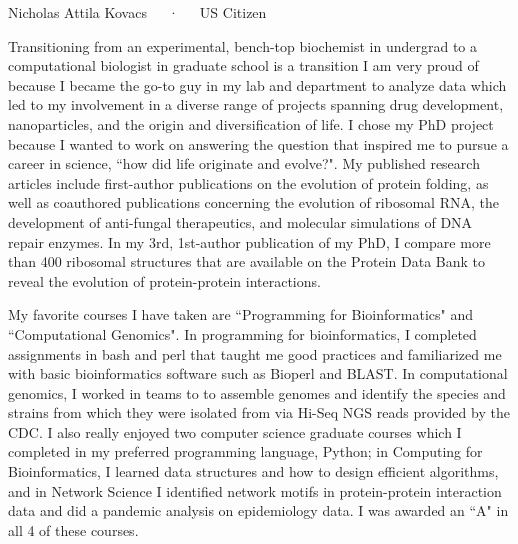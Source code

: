 \documentclass[11pt, letterpaper]{CV_latex_class}
\begin{document}
\makecvheader

\makecvfooter
  {Nicholas Attila Kovacs~~~·~~~US Citizen}

\makelettertitle

\begin{cvletter}


\hspace{1em} Transitioning from an experimental, bench-top biochemist in undergrad to a computational biologist in graduate school is a transition I am very proud of because I became the go-to guy in my lab and department to analyze data which led to my involvement in a diverse range of projects spanning drug development, nanoparticles, and the origin and diversification of life. I chose my PhD project because I wanted to work on answering the question that inspired me to pursue a career in science, ``how did life originate and evolve?". My published research articles include first-author publications on the evolution of protein folding, as well as coauthored publications concerning the evolution of ribosomal RNA, the development of anti-fungal therapeutics, and molecular simulations of DNA repair enzymes. In my 3rd, 1st-author publication of my PhD, I compare more than 400 ribosomal structures that are available on the Protein Data Bank to reveal the evolution of protein-protein interactions.

\hspace{1em}My favorite courses I have taken are ``Programming for Bioinformatics" and ``Computational Genomics". In programming for bioinformatics, I completed assignments in bash and perl that taught me good practices and familiarized me with basic bioinformatics software such as Bioperl and BLAST. In computational genomics, I worked in teams to to assemble genomes and identify the species and strains from which they were isolated from via Hi-Seq NGS reads provided by the CDC. I also really enjoyed two computer science graduate courses which I completed in my preferred programming language, Python; in Computing for Bioinformatics, I learned data structures and how to design efficient algorithms, and in Network Science I identified network motifs in protein-protein interaction data and did a pandemic analysis on epidemiology data. I was awarded an ``A" in all 4 of these courses.  


\end{cvletter}
\end{document}

